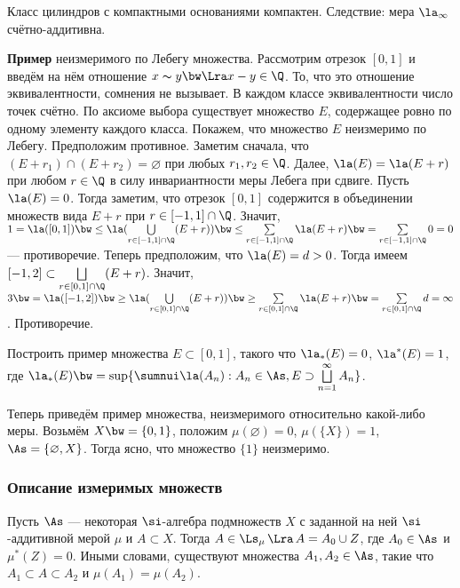 \documentclass[10pt]{article}
\begin{document}
\begin{problem}
Класс цилиндров с компактными основаниями компактен. Следствие: мера
$\la_\infty$ счётно-аддитивна.
\end{problem}

\textbf{Пример} неизмеримого по Лебегу множества. Рассмотрим отрезок
$[0,1]$ и введём на нём отношение $x\thicksim y \bw\Lra x-y\in\Q$.
То, что это отношение эквивалентности, сомнения не вызывает. В
каждом классе эквивалентности число точек счётно. По аксиоме выбора
существует множество $E$, содержащее ровно по одному элементу
каждого класса. Покажем, что множество $E$ неизмеримо по Лебегу.
Предположим противное. Заметим сначала, что $(E+r_1)\cap
(E+r_2)=\varnothing$ при любых $r_1,r_2\in\Q$. Далее,
$\la(E)=\la(E+r)$ при любом $r\in\Q$ в силу инвариантности меры
Лебега при сдвиге. Пусть $\la(E)=0$. Тогда заметим, что отрезок
$[0,1]$ содержится в объединении множеств вида $E+r$ при
$r\in[-1,1]\cap\Q$. Значит, $1=\la([0,1])
\bw\le\la(\bigcup\limits_{r\in[-1,1]\cap\Q}(E+r))\bw
\le\sum\limits_{r\in[-1,1]\cap\Q}\la(E+r)\bw
=\sum\limits_{r\in[-1,1]\cap\Q}0=0$ --- противоречие. Теперь
предположим, что $\la(E)=d>0$. Тогда имеем $[-1,2]\subset
\bigsqcup\limits_{r\in[0,1]\cap\Q}(E+r)$. Значит, $3\bw =\la([-1,2])
\bw\ge\la(\bigcup\limits_{r\in[0,1]\cap\Q}(E+r))\bw
\ge\sum\limits_{r\in[0,1]\cap\Q}\la(E+r)\bw
=\sum\limits_{r\in[0,1]\cap\Q}d=\infty$. Противоречие.

\begin{problem}
Построить пример множества $E\subset[0,1]$, такого что $\la_*(E)=0$,
$\la^*(E)=1$, где $\la_*(E)\bw =\sup\{\sumnui\la(A_n):A_n\in\As,
E\supset\bigsqcup\limits_{n=1}^\infty A_n\}$.
\end{problem}

Теперь приведём пример множества, неизмеримого относительно
какой-либо меры. Возьмём $X\bw=\{0,1\}$, положим
$\mu(\varnothing)=0$, $\mu(\{X\})=1$, $\As=\{\varnothing, X\}$.
Тогда ясно, что множество $\{1\}$ неизмеримо.

\subsubsection{Описание измеримых множеств}

\begin{prop}\label{close_set_from_A}
Пусть $\As$ --- некоторая $\si$-алгебра подмножеств $X$ с заданной
на ней $\si$-аддитивной мерой $\mu$ и $A\subset X$. Тогда
$A\in\Ls_\mu\,\Lra\,A=A_0\cup Z$, где $A_0\in\As$ и $\mu^*(Z)=0$.
Иными словами, существуют множества $A_1,A_2\in\As$, такие что
$A_1\subset A\subset A_2$ и $\mu(A_1)=\mu(A_2)$.
\end{prop}
\end{document}
